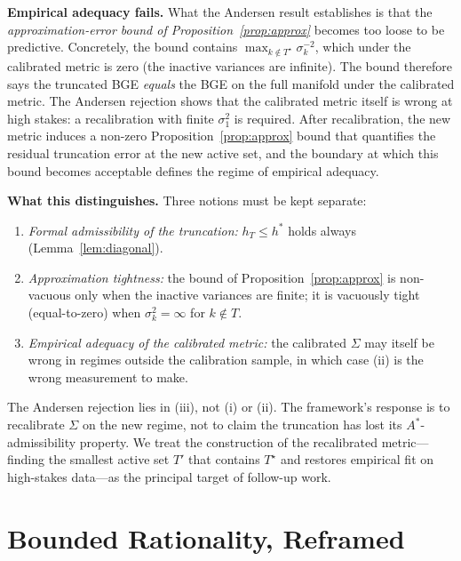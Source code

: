 \documentclass[11pt]{article}
\theoremstyle{definition}
\theoremstyle{remark}
\begin{document}
\textbf{Empirical adequacy fails.} What the Andersen result establishes is that the
\emph{approximation-error bound of Proposition~\ref{prop:approx}} becomes too loose to be predictive.
Concretely, the bound contains $\max_{k \notin T^\star} \sigma_k^{-2}$, which under the calibrated
metric is zero (the inactive variances are infinite). The bound therefore says the truncated BGE
\emph{equals} the BGE on the full manifold under the calibrated metric. The Andersen rejection shows
that the calibrated metric itself is wrong at high stakes: a recalibration with finite $\sigma_1^2$
is required. After recalibration, the new metric induces a non-zero Proposition~\ref{prop:approx}
bound that quantifies the residual truncation error at the new active set, and the boundary at
which this bound becomes acceptable defines the regime of empirical adequacy.

\textbf{What this distinguishes.} Three notions must be kept separate:
\begin{enumerate}[label=(\roman*)]
\item \emph{Formal admissibility of the truncation:} $h_T \leq h^*$ holds always (Lemma~\ref{lem:diagonal}).
\item \emph{Approximation tightness:} the bound of Proposition~\ref{prop:approx} is non-vacuous only when
the inactive variances are finite; it is vacuously tight (equal-to-zero) when $\sigma_k^2 = \infty$
for $k \notin T$.
\item \emph{Empirical adequacy of the calibrated metric:} the calibrated $\Sigma$ may itself be wrong
in regimes outside the calibration sample, in which case (ii) is the wrong measurement to make.
\end{enumerate}
The Andersen rejection lies in (iii), not (i) or (ii). The framework's response is to recalibrate
$\Sigma$ on the new regime, not to claim the truncation has lost its $A^*$-admissibility property.
We treat the construction of the recalibrated metric---finding the smallest active set $T'$ that
contains $T^\star$ and restores empirical fit on high-stakes data---as the principal target of
follow-up work.


\section{Bounded Rationality, Reframed}
\label{sec:reframe}
\end{document}
